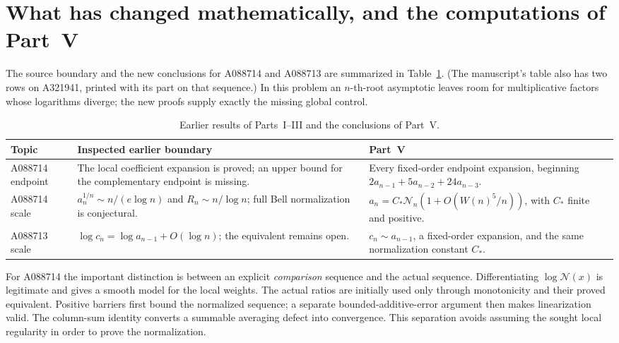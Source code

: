 \documentclass[11pt]{article}
\numberwithin{equation}{section}
\theoremstyle{definition}
\theoremstyle{remark}
\begin{document}
\section{What has changed mathematically, and the computations of Part~V}\label{bnc:sec:changes}

The source boundary and the new conclusions for A088714 and A088713 are
summarized in Table~\ref{bnc:tab:boundary}. (The manuscript's table also
has two rows on A321941, printed with its part on that sequence.) In this
problem an \(n\)-th-root asymptotic leaves room for multiplicative
factors whose logarithms diverge; the new proofs supply exactly the
missing global control.

\begin{table}[htbp]
\centering\small
\caption{Earlier results of Parts~I--III and the conclusions of Part~V.}
\label{bnc:tab:boundary}
\begin{tabular}{@{}>{\raggedright\arraybackslash}p{23mm}>{\raggedright\arraybackslash}p{}>{\raggedright\arraybackslash}p{}@{}}
\toprule
Topic&Inspected earlier boundary&Part~V\\
\midrule
A088714 endpoint&
The local coefficient expansion is proved; an upper bound for the
complementary endpoint is missing.&
Every fixed-order endpoint expansion, beginning
\(2a_{n-1}+5a_{n-2}+24a_{n-3}\).\\[3pt]
A088714 scale&
\(a_n^{1/n}\sim n/(e\log n)\) and \(R_n\sim n/\log n\);
full Bell normalization is conjectural.&
\(a_n=C_*\mathcal N_n(1+O(W(n)^5/n))\), with
\(C_*\) finite and positive.\\[3pt]
A088713 scale&
\(\log c_n=\log a_{n-1}+O(\log n)\); the equivalent remains open.&
\(c_n\sim a_{n-1}\), a fixed-order expansion, and the same
normalization constant \(C_*\).\\
\bottomrule
\end{tabular}
\end{table}

For A088714 the important distinction is between an explicit
\emph{comparison} sequence and the actual sequence.  Differentiating
\(\log\mathcal N(x)\) is legitimate and gives a smooth model for the
local weights.  The actual ratios are initially used only through
monotonicity and their proved equivalent.  Positive barriers first
bound the normalized sequence; a separate bounded-additive-error
argument then makes linearization valid.  The column-sum identity
converts a summable averaging defect into convergence.  This
separation avoids assuming the sought local regularity in order to
prove the normalization.
\end{document}
